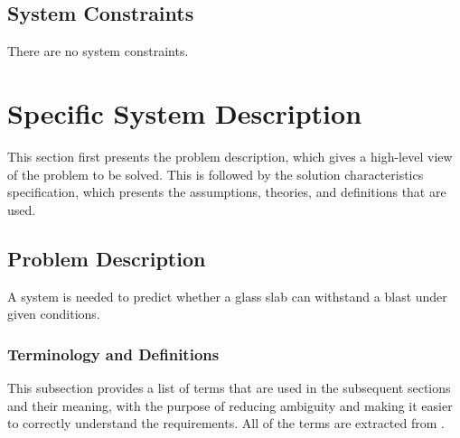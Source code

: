 \documentclass[12pt]{article}
\begin{document}
\subsection{System Constraints}
\label{Sec:SysConstraints}
There are no system constraints.

\section{Specific System Description}
\label{Sec:SpecSystDesc}
This section first presents the problem description, which gives a high-level view of the problem to be solved. This is followed by the solution characteristics specification, which presents the assumptions, theories, and definitions that are used.

\subsection{Problem Description}
\label{Sec:ProbDesc}
A system is needed to predict whether a glass slab can withstand a blast under given conditions.

\subsubsection{Terminology and Definitions}
\label{Sec:TermDefs}
This subsection provides a list of terms that are used in the subsequent sections and their meaning, with the purpose of reducing ambiguity and making it easier to correctly understand the requirements. All of the terms are extracted from \cite{astm2009}.
\end{document}
